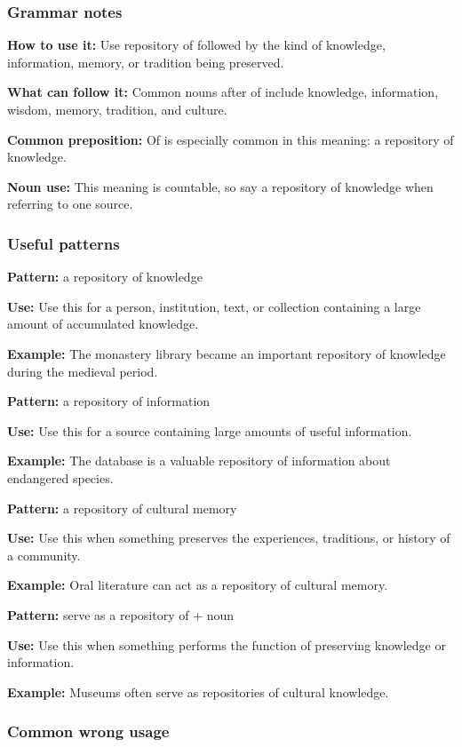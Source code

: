 \documentclass[11pt]{article}
\begin{document}
\subsubsection{Grammar notes}
\textbf{How to use it:} Use repository of followed by the kind of knowledge, information, memory, or tradition being preserved.

\textbf{What can follow it:} Common nouns after of include knowledge, information, wisdom, memory, tradition, and culture.

\textbf{Common preposition:} Of is especially common in this meaning: a repository of knowledge.

\textbf{Noun use:} This meaning is countable, so say a repository of knowledge when referring to one source.

\subsubsection{Useful patterns}
\textbf{Pattern:} a repository of knowledge

\textbf{Use:} Use this for a person, institution, text, or collection containing a large amount of accumulated knowledge.

\textbf{Example:} The monastery library became an important repository of knowledge during the medieval period.

\textbf{Pattern:} a repository of information

\textbf{Use:} Use this for a source containing large amounts of useful information.

\textbf{Example:} The database is a valuable repository of information about endangered species.

\textbf{Pattern:} a repository of cultural memory

\textbf{Use:} Use this when something preserves the experiences, traditions, or history of a community.

\textbf{Example:} Oral literature can act as a repository of cultural memory.

\textbf{Pattern:} serve as a repository of + noun

\textbf{Use:} Use this when something performs the function of preserving knowledge or information.

\textbf{Example:} Museums often serve as repositories of cultural knowledge.

\subsubsection{Common wrong usage}
\end{document}
